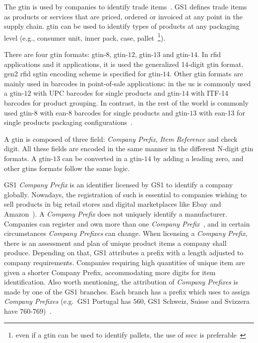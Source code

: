 The \ac{gtin} is used by companies to identify trade items~\cite{GS1GTINExecutive, GS1GTINManagement}. 
GS1 defines trade items as products or services that are priced, ordered or invoiced at any point in the supply chain.
\ac{gtin} can be used to identify types of products at any packaging level (e.g., consumer unit, inner pack, case, pallet~\footnote{even if a \ac{gtin} can be used to identify pallets, the use of \ac{sscc} is preferable~\cite{GS1KeysImplementation}}).

There are four \ac{gtin} formats: \ac{gtin}-$8$, \ac{gtin}-$12$, \ac{gtin}-$13$ and \ac{gtin}-$14$. In \ac{rfid} applications and \ac{it} applications, it is used the generalized 14-digit \ac{gtin} format. \ac{gen2} \ac{rfid} \ac{sgtin} encoding scheme is specified for \ac{gtin}-$14$.
Other \ac{gtin} formats are mainly used in barcodes in point-of-sale applications: in the \ac{us} is commonly used a \ac{gtin}-$12$ with UPC barcodes for single products and \ac{gtin}-$14$ with ITF-14 barcodes for product grouping. In contrast, in the rest of the world is commonly used \ac{gtin}-$8$ with \ac{ean}-8 barcodes for single products and \ac{gtin}-$13$ with \ac{ean}-13 for single products packaging configurations~\cite{BarcodeGS1General,GS1BarcodeChart}.

A \ac{gtin} is composed of three field: \emph{Company Prefix}, \emph{Item Reference} and check digit. All these fields are encoded in the same manner in the different N-digit \ac{gtin} formats. A \ac{gtin}-$13$ can be converted in a \ac{gtin}-$14$ by adding a leading zero, and other \acp{gtin} formats follow the same logic.

GS1 \emph{Company Prefix} is an identifier licensed by GS1 to identify a company globally. 
Nowadays, the registration of such is essential to companies wishing to sell products in big retail stores and digital marketplaces like Ebay and Amazon~\cite{ListingRequirementsProduct}).
A \emph{Company Prefix} does not uniquely identify a manufacturer. Companies can register and own more than one \emph{Company Prefix}~\cite{GS1EPCglobalArchitecture}, and in certain circumstances \emph{Company Prefixes} can change.
When licensing a \emph{Company Prefix}, there is an assessment and plan of unique product items a company shall produce. 
Depending on that, GS1 attributes a prefix with a length adjusted to company requirements. 
Companies requiring high quantities of unique item are given a shorter Company Prefix, accommodating more digits for item identification.
Also worth mentioning, the attribution of \emph{Company Prefixes} is made by one of the GS1 branches. Each branch has a prefix which uses to assign \emph{Company Prefixes} (e.g.\ GS1 Portugal has $560$, GS1 Schweiz, Suisse and Svizzera have $760$-$769$)~\cite{anonymousGS1CompanyPrefix2014}.

